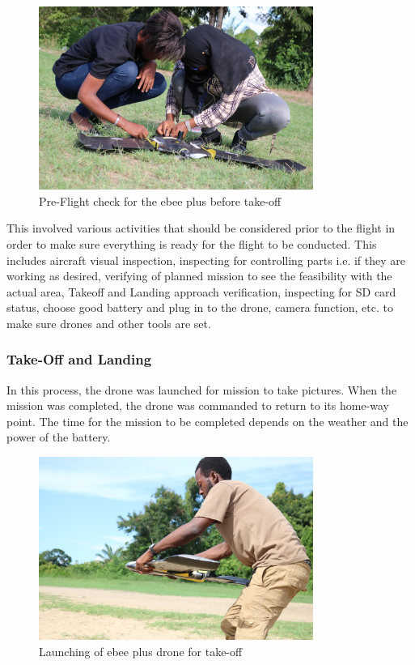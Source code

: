 \documentclass[a4paper,12pt,twoside]{article}
\begin{document}
         \begin{figure} %
            \centering
            \includegraphics[width=0.8\textwidth]{images/image18.jpg}
            \caption{Pre-Flight check for the ebee plus before take-off}
        \end{figure}
    
        This involved various activities that should be considered prior to the flight in order to make sure everything is ready for the flight to be conducted. This includes aircraft visual inspection, inspecting for controlling parts i.e. if they are working as desired, verifying of planned mission to see the feasibility with the actual area, Takeoff and Landing approach verification, inspecting for SD card status, choose good battery and plug in to the drone, camera function, etc. to make sure drones and other tools are set.
    
    \subsubsection{Take-Off and Landing}
        In this process, the drone was launched for mission to take pictures. When the mission was completed, the drone was commanded to return to its home-way point. The time for the mission to be completed depends on the weather and the power of the battery.
    
        \begin{figure} %
            \centering
            \includegraphics[width=0.8\textwidth]{images/image6.jpg}
            \caption{Launching of ebee plus drone for take-off}
        \end{figure}
    
\end{document}

